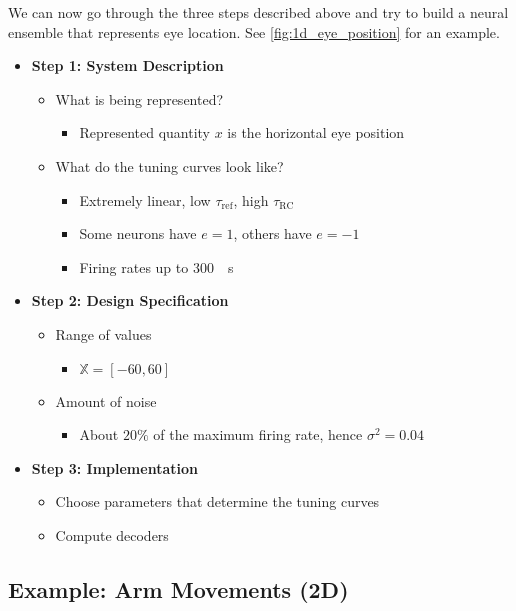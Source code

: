 \documentclass[10pt,letterpaper,oneside]{article}
\begin{document}
We can now go through the three steps described above and try to build a neural ensemble that represents eye location. See \cref{fig:1d_eye_position} for an example.
\begin{multicols}{2}
\begin{itemize}
	\item \textbf{Step 1: System Description}
	\begin{itemize}
		\item What is being represented?
		\begin{itemize}
			\item Represented quantity $x$ is the horizontal eye position
		\end{itemize}
		\item What do the tuning curves look like?
		\begin{itemize}
			\item Extremely linear, low $\tau_\mathrm{ref}$, high $\tau_\mathrm{RC}$
			\item Some neurons have $e = 1$, others have $e = -1$
			\item Firing rates up to \SI{300}{\per\second}
		\end{itemize}
	\end{itemize}
	\columnbreak
	\item \textbf{Step 2: Design Specification}
	\begin{itemize}
		\item Range of values
		\begin{itemize}
			\item $\mathbb{X} = [-60, 60]$
		\end{itemize}
		\item Amount of noise
		\begin{itemize}
			\item About $20\%$ of the maximum firing rate, hence $\sigma^2 = 0.04$
		\end{itemize}
	\end{itemize}
	\item \textbf{Step 3: Implementation}
	\begin{itemize}
		\item Choose parameters that determine the tuning curves
		\item Compute decoders
	\end{itemize}
\end{itemize}
\end{multicols}

\subsection{Example: Arm Movements (2D)}
\end{document}
